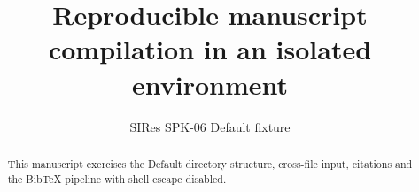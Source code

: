 \documentclass[11pt]{article}
\title{Reproducible manuscript compilation in an isolated environment}
\author{SIRes SPK-06 Default fixture}
\date{}
\begin{document}
\maketitle
\begin{abstract}
This manuscript exercises the Default directory structure, cross-file input,
citations and the BibTeX pipeline with shell escape disabled.
\end{abstract}







\end{document}
